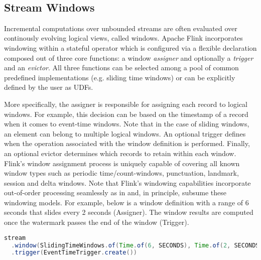  

\subsection{Stream Windows}
Incremental computations over unbounded streams are often evaluated over continously evolving logical views, called windows. Apache Flink incorporates windowing within a stateful operator which is configured via a flexible declaration composed out of three core functions: a window \textit{assigner} and optionally a \textit{trigger} and an \textit{evictor}. All three functions can be selected among a pool of common predefined implementations (e.g. sliding time windows) or can be explicitly defined by the user as UDFs.

More specifically, the assigner is responsible for assigning each record to logical windows. For example, this decision can be based on the timestamp of a record when it comes to event-time windows. Note that in the case of sliding windows, an element can belong to multiple logical windows. An optional trigger defines when the operation associated with the window definition is performed. Finally, an optional evictor determines which records to retain within each window. Flink's window assignment process is uniquely capable of covering all known window types such as periodic time/count-windows, punctuation, landmark, session and delta windows. Note that Flink's windowing capabilities incorporate out-of-order processing seamlessly as in \cite{li2005semantics, akidau2015dataflow} and, in principle, subsume these windowing models. For example, below is a window definition with a range of 6 seconds that slides every 2 seconds (Assigner). The window results are computed once the watermark passes the end of the window (Trigger).

\begin{lstlisting}[language=Java]
stream
  .window(SlidingTimeWindows.of(Time.of(6, SECONDS), Time.of(2, SECONDS))
  .trigger(EventTimeTrigger.create())
\end{lstlisting}


